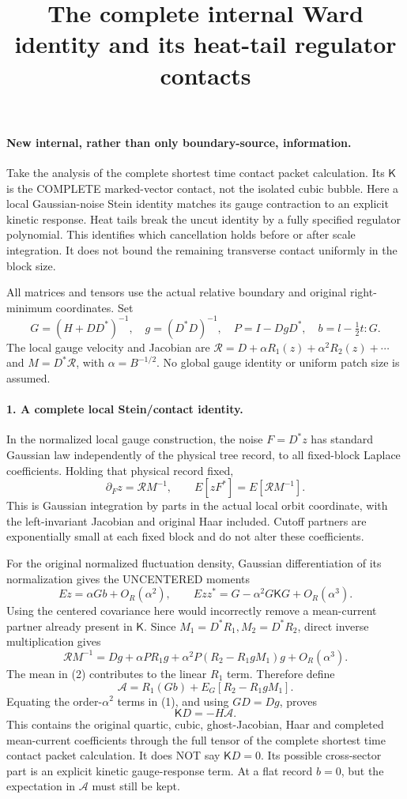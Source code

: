 \documentclass[11pt]{article}
\title{The complete internal Ward identity and its heat-tail regulator contacts}\author{}\date{}
\begin{document}
\maketitle
\paragraph{New internal, rather than only boundary-source, information.}
Take the analysis of the complete shortest time contact packet calculation. Its $\mathsf K$ is the COMPLETE
marked-vector contact, not the isolated cubic bubble. Here a local
Gaussian-noise Stein identity matches its gauge contraction to an
explicit kinetic response. Heat tails break the uncut identity by a
fully specified regulator polynomial. This identifies which cancellation
holds before or after scale integration. It does not bound the remaining
transverse contact uniformly in the block size.

All matrices and tensors use the actual relative boundary and original
right-minimum coordinates. Set
\[
 G=(H+DD^*)^{-1},\quad g=(D^*D)^{-1},\quad
 P=I-DgD^*,\quad b=l-\tfrac12 t:G.
\]
The local gauge velocity and Jacobian are
$\mathcal R=D+\alpha R_1(z)+\alpha^2R_2(z)+\cdots$ and
$M=D^*\mathcal R$, with $\alpha=B^{-1/2}$. No global gauge identity or
uniform patch size is assumed.

\paragraph{1. A complete local Stein/contact identity.}
In the normalized local gauge construction, the noise $F=D^*z$ has
standard Gaussian law independently of the physical tree record, to
all fixed-block Laplace coefficients. Holding that physical record fixed,
\[
 \partial_F z=\mathcal R M^{-1},\qquad
 E[zF^*]=E[\mathcal R M^{-1}].                                    \tag{1}
\]
This is Gaussian integration by parts in the actual local orbit
coordinate, with the left-invariant Jacobian and original Haar included.
Cutoff partners are exponentially small at each fixed block and do not
alter these coefficients.

For the original normalized fluctuation density, Gaussian differentiation
of its normalization gives the UNCENTERED moments
\[
 Ez=\alpha Gb+O_R(\alpha^2),\qquad
 Ezz^*=G-\alpha^2G\mathsf K G+O_R(\alpha^3).                     \tag{2}
\]
Using the centered covariance here would incorrectly remove a mean-current
partner already present in $\mathsf K$.
Since $M_1=D^*R_1,M_2=D^*R_2$, direct inverse multiplication gives
\[
 \mathcal R M^{-1}=Dg+\alpha P R_1g
                +\alpha^2P(R_2-R_1gM_1)g+O_R(\alpha^3).
\]
The mean in (2) contributes to the linear $R_1$ term. Therefore define
\[
 \mathcal A=R_1(Gb)+E_G[R_2-R_1gM_1].
\]
Equating the order-$\alpha^2$ terms in (1), and using $GD=Dg$, proves
\[
 \boxed{\mathsf K D=-H\mathcal A.}                              \tag{3}
\]
This contains the original quartic, cubic, ghost-Jacobian, Haar and
completed mean-current coefficients through the full tensor of the complete shortest time contact packet calculation.
It does NOT say $\mathsf K D=0$. Its possible cross-sector part is an
explicit kinetic gauge-response term. At a flat record $b=0$, but the
expectation in $\mathcal A$ must still be kept.
\end{document}
